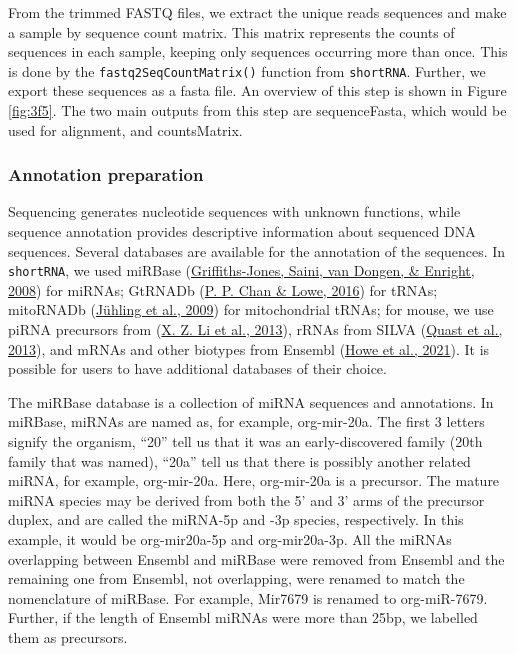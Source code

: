 \documentclass[12pt,twoside]{reedthesis}
\begin{document}
From the trimmed FASTQ files, we extract the unique reads sequences and
make a sample by sequence count matrix. This matrix represents the
counts of sequences in each sample, keeping only sequences occurring
more than once. This is done by the \texttt{fastq2SeqCountMatrix()} function from
\texttt{shortRNA}. Further, we export these sequences as a fasta file. An
overview of this step is shown in Figure \ref{fig:3f5}. The two main outputs from
this step are sequenceFasta, which would be used for alignment, and
countsMatrix.

\hypertarget{annotation-preparation}{%
\subsubsection{Annotation preparation}\label{annotation-preparation}}

Sequencing generates nucleotide sequences with unknown functions, while
sequence annotation provides descriptive information about sequenced DNA
sequences. Several databases are available for the annotation of the
sequences. In \texttt{shortRNA}, we used miRBase (\protect\hyperlink{ref-griffiths-jones2008}{Griffiths-Jones, Saini, van Dongen, \& Enright, 2008}) for
miRNAs; GtRNADb (\protect\hyperlink{ref-chan2016}{P. P. Chan \& Lowe, 2016}) for tRNAs; mitoRNADb (\protect\hyperlink{ref-juxfchling2009}{Jühling et al., 2009}) for
mitochondrial tRNAs; for mouse, we use piRNA precursors from (\protect\hyperlink{ref-li2013}{X. Z. Li et al., 2013}),
rRNAs from SILVA (\protect\hyperlink{ref-quast2013}{Quast et al., 2013}), and mRNAs and other biotypes from Ensembl
(\protect\hyperlink{ref-howe2021}{Howe et al., 2021}). It is possible for users to have additional databases of
their choice.

The miRBase database is a collection of miRNA sequences and annotations.
In miRBase, miRNAs are named as, for example, org-mir-20a. The first 3
letters signify the organism, ``20'' tell us that it was an
early-discovered family (20th family that was named), ``20a'' tell us that
there is possibly another related miRNA, for example, org-mir-20a. Here,
org-mir-20a is a precursor. The mature miRNA species may be derived from
both the 5' and 3' arms of the precursor duplex, and are called the
miRNA-5p and -3p species, respectively. In this example, it would be
org-mir20a-5p and org-mir20a-3p. All the miRNAs overlapping between
Ensembl and miRBase were removed from Ensembl and the remaining one from
Ensembl, not overlapping, were renamed to match the nomenclature of
miRBase. For example, Mir7679 is renamed to org-miR-7679. Further, if
the length of Ensembl miRNAs were more than 25bp, we labelled them as
precursors.
\end{document}
